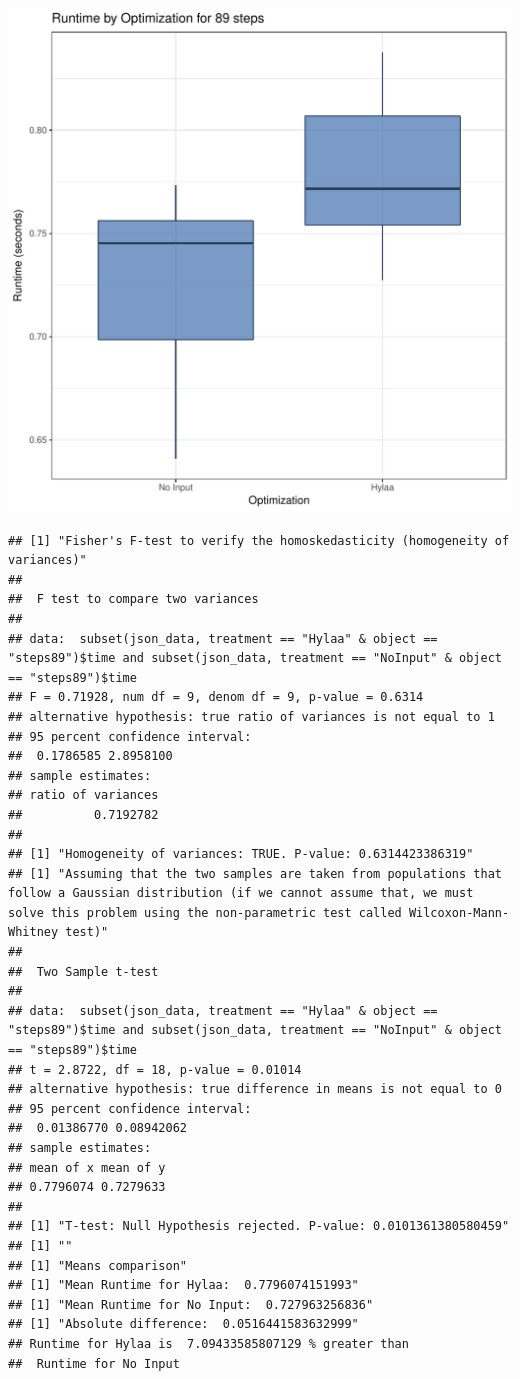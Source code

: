 \documentclass{article}\usepackage[]{graphicx}\usepackage[]{color}
\makeatletter
\def\maxwidth{ %
  \ifdim\Gin@nat@width>\linewidth
    \linewidth
  \else
    \Gin@nat@width
  \fi
}
\newenvironment{kframe}{%
 \def\at@end@of@kframe{}%
 \ifinner\ifhmode%
  \def\at@end@of@kframe{\end{minipage}}%
  \begin{minipage}{\columnwidth}%
 \fi\fi%
 \def\FrameCommand##1{\hskip\@totalleftmargin \hskip-\fboxsep
 \colorbox{shadecolor}{##1}\hskip-\fboxsep
     \hskip-\linewidth \hskip-\@totalleftmargin \hskip\columnwidth}%
 \MakeFramed {\advance\hsize-\width
   \@totalleftmargin\z@ \linewidth\hsize
   \@setminipage}}%
 {\par\unskip\endMakeFramed%
 \at@end@of@kframe}
\newenvironment{knitrout}{}{} %
\makeatother
\begin{document}
\begin{knitrout}
\color{fgcolor}
\includegraphics[width=\maxwidth]{figure/RH4_steps89-1} 
\begin{kframe}\begin{verbatim}
## [1] "Fisher's F-test to verify the homoskedasticity (homogeneity of variances)"
## 
## 	F test to compare two variances
## 
## data:  subset(json_data, treatment == "Hylaa" & object == "steps89")$time and subset(json_data, treatment == "NoInput" & object == "steps89")$time
## F = 0.71928, num df = 9, denom df = 9, p-value = 0.6314
## alternative hypothesis: true ratio of variances is not equal to 1
## 95 percent confidence interval:
##  0.1786585 2.8958100
## sample estimates:
## ratio of variances 
##          0.7192782 
## 
## [1] "Homogeneity of variances: TRUE. P-value: 0.6314423386319"
## [1] "Assuming that the two samples are taken from populations that follow a Gaussian distribution (if we cannot assume that, we must solve this problem using the non-parametric test called Wilcoxon-Mann-Whitney test)"
## 
## 	Two Sample t-test
## 
## data:  subset(json_data, treatment == "Hylaa" & object == "steps89")$time and subset(json_data, treatment == "NoInput" & object == "steps89")$time
## t = 2.8722, df = 18, p-value = 0.01014
## alternative hypothesis: true difference in means is not equal to 0
## 95 percent confidence interval:
##  0.01386770 0.08942062
## sample estimates:
## mean of x mean of y 
## 0.7796074 0.7279633 
## 
## [1] "T-test: Null Hypothesis rejected. P-value: 0.0101361380580459"
## [1] ""
## [1] "Means comparison"
## [1] "Mean Runtime for Hylaa:  0.7796074151993"
## [1] "Mean Runtime for No Input:  0.727963256836"
## [1] "Absolute difference:  0.0516441583632999"
## Runtime for Hylaa is  7.09433585807129 % greater than 
##  Runtime for No Input
\end{verbatim}
\end{kframe}
\end{knitrout}
\end{document}
